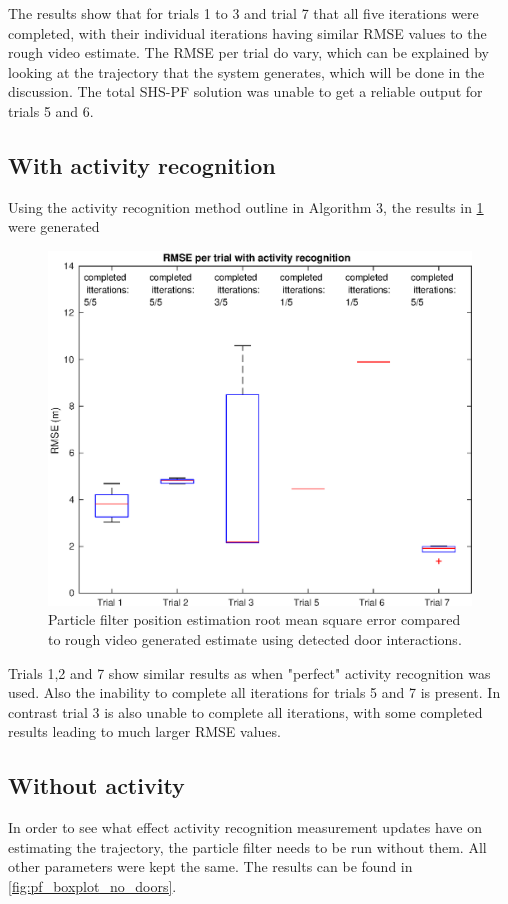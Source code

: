 The results show that for trials 1 to 3 and trial 7 that all five iterations were completed, with their individual iterations having similar RMSE values to the rough video estimate. The RMSE per trial do vary, which can be explained by looking at the trajectory that the system generates, which will be done in the discussion. The total SHS-PF solution was unable to get a reliable output for trials 5 and 6.\par 
\newpage
\subsection{With activity recognition}

Using the activity recognition method outline in Algorithm 3, the results in \cref{fig:rmse_per_trial_with_activity_recognition} were generated

\begin{figure}[H]
	\centering
	\includegraphics[width=0.7\linewidth]{images/20201118_1211_RMSE_per_trial_with_activity_recognition}
	\caption[Particle Filter position estimation performance with door interaction]{Particle filter position estimation root mean square error compared to rough video generated estimate using detected door interactions.}
	\label{fig:rmse_per_trial_with_activity_recognition}
\end{figure}

Trials 1,2 and 7 show similar results as when "perfect" activity recognition was used. Also the inability to complete all iterations for trials 5 and 7 is present. In contrast trial 3 is also unable to complete all iterations, with some completed results leading to much larger RMSE values. 

\newpage
\subsection{Without activity}
In order to see what effect activity recognition measurement updates have on estimating the trajectory, the particle filter needs to be run without them. All other parameters were kept the same. The results can be found in \cref{fig:pf_boxplot_no_doors}.

